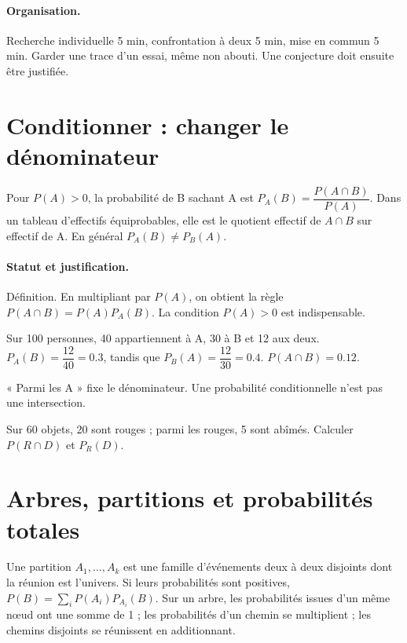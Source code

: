 \paragraph{Organisation.} Recherche individuelle 5 min, confrontation à deux 5 min, mise en commun 5 min. Garder une trace d’un essai, même non abouti. Une conjecture doit ensuite être justifiée.
\mxnewpage
\section{Conditionner : changer le dénominateur}\label{C05-U1}
\begin{keypoint}
Pour $P(A)>0$, la probabilité de B sachant A est $P_A(B)=\dfrac{P(A\cap B)}{P(A)}$. Dans un tableau d’effectifs équiprobables, elle est le quotient effectif de $A\cap B$ sur effectif de A. En général $P_A(B)\ne P_B(A)$.
\end{keypoint}
\paragraph{Statut et justification.} Définition. En multipliant par $P(A)$, on obtient la règle $P(A\cap B)=P(A)P_A(B)$. La condition $P(A)>0$ est indispensable.
\begin{example}Sur 100 personnes, 40 appartiennent à A, 30 à B et 12 aux deux. $P_A(B)=\dfrac{12}{40}=\num{0,3}$, tandis que $P_B(A)=\dfrac{12}{30}=\num{0,4}$. $P(A\cap B)=\num{0,12}$.\end{example}\label{C05-EX1}
\begin{pitfall}« Parmi les A » fixe le dénominateur. Une probabilité conditionnelle n’est pas une intersection.\end{pitfall}
\begin{application}Sur 60 objets, 20 sont rouges ; parmi les rouges, 5 sont abîmés. Calculer $P(R\cap D)$ et $P_R(D)$.\end{application}\label{C05-AP1}
\section{Arbres, partitions et probabilités totales}\label{C05-U2}
\begin{keypoint}
Une partition $A_1,\ldots,A_k$ est une famille d’événements deux à deux disjoints dont la réunion est l’univers. Si leurs probabilités sont positives, $P(B)=\sum_iP(A_i)P_{A_i}(B)$. Sur un arbre, les probabilités issues d’un même nœud ont une somme de 1 ; les probabilités d’un chemin se multiplient ; les chemins disjoints se réunissent en additionnant.
\end{keypoint}
